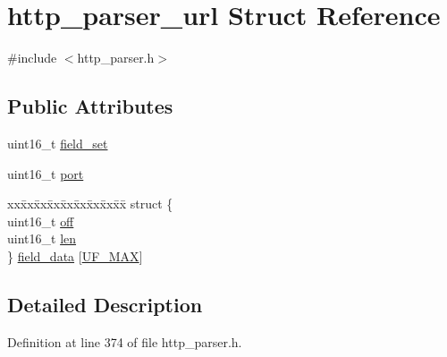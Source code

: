 \hypertarget{structhttp__parser__url}{\section{http\-\_\-parser\-\_\-url Struct Reference}
\label{structhttp__parser__url}
}


{\ttfamily \#include $<$http\-\_\-parser.\-h$>$}

\subsection*{Public Attributes}
\begin{DoxyCompactItemize}
\item 
uint16\-\_\-t \hyperlink{structhttp__parser__url_a77af61a480f11c41938810dd76ca49eb}{field\-\_\-set}
\item 
uint16\-\_\-t \hyperlink{structhttp__parser__url_a875fb8faf3ee45707078eda5435fa563}{port}
\item 
\begin{tabbing}
xx\=xx\=xx\=xx\=xx\=xx\=xx\=xx\=xx\=\kill
struct \{\\
\>uint16\_t \hyperlink{structhttp__parser__url_a6510826f3aa9a1100ac5f714323edeb1}{off}\\
\>uint16\_t \hyperlink{structhttp__parser__url_a60fb784a989dd5a95e5bd19d468d22c7}{len}\\
\} \hyperlink{structhttp__parser__url_a96a1fed71f3471692e9832f91b42f7db}{field\_data} \mbox{[}\hyperlink{http__parser_8h_a9ca1f91c2958091e2ac9e9b2f903d4eba4b40c88291e4fa018de04553e7e1adfd}{UF\_MAX}\mbox{]}\\

\end{tabbing}\end{DoxyCompactItemize}


\subsection{Detailed Description}


Definition at line 374 of file http\-\_\-parser.\-h.



